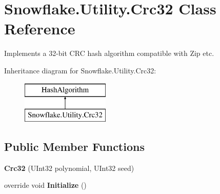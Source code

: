 \hypertarget{class_snowflake_1_1_utility_1_1_crc32}{}\section{Snowflake.\+Utility.\+Crc32 Class Reference}
\label{class_snowflake_1_1_utility_1_1_crc32}


Implements a 32-\/bit C\+R\+C hash algorithm compatible with Zip etc.  


Inheritance diagram for Snowflake.\+Utility.\+Crc32\+:\begin{figure}[H]
\begin{center}
\leavevmode
\includegraphics[height=2.000000cm]{class_snowflake_1_1_utility_1_1_crc32}
\end{center}
\end{figure}
\subsection*{Public Member Functions}
\begin{DoxyCompactItemize}
\item 
\hypertarget{class_snowflake_1_1_utility_1_1_crc32_a90e52671edd3e953485905054c094ae3}{}{\bfseries Crc32} (U\+Int32 polynomial, U\+Int32 seed)\label{class_snowflake_1_1_utility_1_1_crc32_a90e52671edd3e953485905054c094ae3}

\item 
\hypertarget{class_snowflake_1_1_utility_1_1_crc32_ad148a1dd67a36490f8ff24f3aa753341}{}override void {\bfseries Initialize} ()\label{class_snowflake_1_1_utility_1_1_crc32_ad148a1dd67a36490f8ff24f3aa753341}

\end{DoxyCompactItemize}
